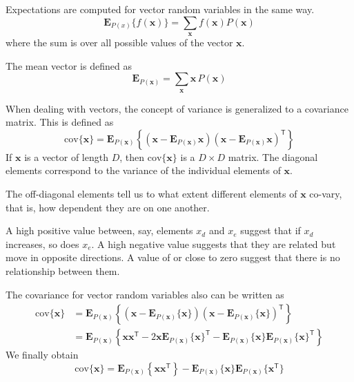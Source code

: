 Expectations are computed for vector random variables in the same way.
\begin{equation}
\mathbf{E}_{P(x)}\{f(\mathbf{x})\} = \sum_{\mathbf{x}} f(\mathbf{x}) P(\mathbf{x})
\end{equation}
where the sum is over all possible values of the vector $\mathbf{x}$.

The mean vector is defined as
\begin{equation}
\mathbf{E}_{P(\mathbf{x})} = \sum_{\mathbf{x}} \mathbf{x}\,P(\mathbf{x})
\end{equation}

When dealing with vectors, the concept of variance is generalized to a covariance matrix.
This is defined as 
\begin{equation}
\mathrm{cov}\{\mathbf{x}\} = \mathbf{E}_{P(\mathbf{x})}\left\{
\left( \mathbf{x} - \mathbf{E}_{P(\mathbf{x})}{\mathbf{x}} \right)
\left( \mathbf{x} - \mathbf{E}_{P(\mathbf{x})}{\mathbf{x}} \right)^{\mathsf{T}}
\right\}
\end{equation}
If $\mathbf{x}$ is a vector of length $D$, then $\mathrm{cov}\{\mathbf{x}\}$
is a $D \times D$ matrix. The diagonal elements correspond to the variance of
the individual elements of $\mathbf{x}$.

The off-diagonal elements tell us to
what extent different elements of $\mathbf{x}$ co-vary, that is, how dependent
they are on one another.

A high positive value between, say, elements $x_d$ and $x_e$ suggest that if
$x_d$ increases, so does $x_e$. A high negative value suggests that they are
related but move in opposite directions.
A value of or close to zero suggest that there is no relationship between them.

The covariance for vector random variables also can be written as
\begin{align*}
\mathrm{cov}\{\mathbf{x}\} & = \mathbf{E}_{P(\mathbf{x})}\left\{
\left( \mathbf{x} - \mathbf{E}_{P(\mathbf{x})}\{\mathbf{x}\} \right)
\left( \mathbf{x} - \mathbf{E}_{P(\mathbf{x})}\{\mathbf{x}\} \right)^{\mathsf{T}}
\right\} \\
& = \mathbf{E}_{P(\mathbf{x})}\left\{
\mathbf{xx}^{\mathsf{T}} -
2\mathbf{x} \mathbf{E}_{P(\mathbf{x})}\{\mathbf{x}\}^{\mathsf{T}} - 
\mathbf{E}_{P(\mathbf{x})}\{\mathbf{x}\} \mathbf{E}_{P(\mathbf{x})}\{\mathbf{x}\}^{\mathsf{T}}
\right\}
\end{align*}
%
We finally obtain
\begin{equation}
\mathrm{cov}\{\mathbf{x}\} = \mathbf{E}_{P(\mathbf{x})}\left\{\mathbf{x}\mathbf{x}^{\mathsf{T}}
\right\}
- \mathbf{E}_{P(\mathbf{x})}\{\mathbf{x}\} \mathbf{E}_{P(\mathbf{x})}\{\mathbf{x}^{\mathsf{T}}\}
\end{equation}

